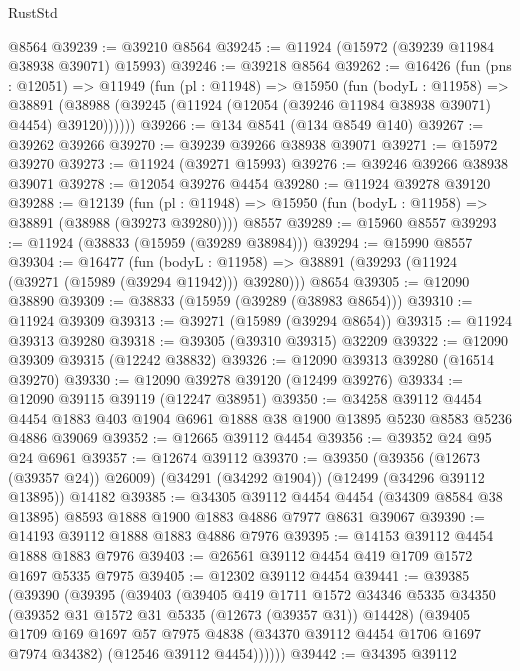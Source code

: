 \begin{lexlean}{RustStd}
\begin{coremodule}
{\begin{coremodule}
{{{{{{{{{{{{{{{{{{{{{{{{{{{{{{{{{{{{{{{{{{{{{{{{{{{{{{{{{{{{{{{{{{{{{{{{{{{{{{{{    @8564
@39239 := @39210 @8564
@39245 := @11924 (@15972 (@39239 @11984 @38938 @39071) @15993)
@39246 := @39218 @8564
@39262 := @16426
    (fun (pns : @12051) =>
    @11949
      (fun (pl : @11948) =>
      @15950
        (fun (bodyL : @11958) =>
        @38891 (@38988 (@39245 (@11924 (@12054 (@39246 @11984 @38938 @39071) @4454) @39120))))))
@39266 := @134 @8541 (@134 @8549 @140)
@39267 := @39262 @39266
@39270 := @39239 @39266 @38938 @39071
@39271 := @15972 @39270
@39273 := @11924 (@39271 @15993)
@39276 := @39246 @39266 @38938 @39071
@39278 := @12054 @39276 @4454
@39280 := @11924 @39278 @39120
@39288 := @12139
    (fun (pl : @11948) => @15950 (fun (bodyL : @11958) => @38891 (@38988 (@39273 @39280))))
    @8557
@39289 := @15960 @8557
@39293 := @11924 (@38833 (@15959 (@39289 @38984)))
@39294 := @15990 @8557
@39304 := @16477
    (fun (bodyL : @11958) => @38891 (@39293 (@11924 (@39271 (@15989 (@39294 @11942))) @39280)))
    @8654
@39305 := @12090 @38890
@39309 := @38833 (@15959 (@39289 (@38983 @8654)))
@39310 := @11924 @39309
@39313 := @39271 (@15989 (@39294 @8654))
@39315 := @11924 @39313 @39280
@39318 := @39305 (@39310 @39315) @32209
@39322 := @12090 @39309 @39315 (@12242 @38832)
@39326 := @12090 @39313 @39280 (@16514 @39270)
@39330 := @12090 @39278 @39120 (@12499 @39276)
@39334 := @12090 @39115 @39119 (@12247 @38951)
@39350 := @34258
    @39112
    @4454
    @4454
    @1883
    @403
    @1904
    @6961
    @1888
    @38
    @1900
    @13895
    @5230
    @8583
    @5236
    @4886
    @39069
@39352 := @12665 @39112 @4454
@39356 := @39352 @24 @95 @24 @6961
@39357 := @12674 @39112
@39370 := @39350
    (@39356 (@12673 (@39357 @24)) @26009)
    (@34291 (@34292 @1904))
    (@12499 (@34296 @39112 @13895))
    @14182
@39385 := @34305
    @39112
    @4454
    @4454
    (@34309 @8584 @38 @13895)
    @8593
    @1888
    @1900
    @1883
    @4886
    @7977
    @8631
    @39067
@39390 := @14193 @39112 @1888 @1883 @4886 @7976
@39395 := @14153 @39112 @4454 @1888 @1883 @7976
@39403 := @26561 @39112 @4454 @419 @1709 @1572 @1697 @5335 @7975
@39405 := @12302 @39112 @4454
@39441 := @39385
    (@39390
      (@39395
        (@39403
          (@39405
            @419
            @1711
            @1572
            @34346
            @5335
            @34350
            (@39352 @31 @1572 @31 @5335 (@12673 (@39357 @31)) @14428)
            (@39405
              @1709
              @169
              @1697
              @57
              @7975
              @4838
              (@34370 @39112 @4454 @1706 @1697 @7974 @34382)
              (@12546 @39112 @4454))))))
@39442 := @34395 @39112
}}}}}}}}}}}}}}}}}}}}}}}}}}}}}}}}}}}}}}}}}}}}}}}}}}}}}}}}}}}}}}}}}}}}}}}}}}}}}}}}
\end{coremodule}}
\end{coremodule}
\end{lexlean}
